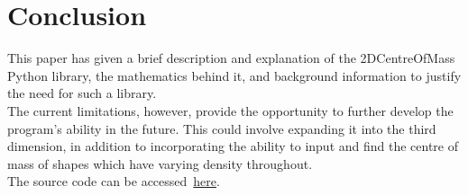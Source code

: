 \documentclass{article}
\begin{document}
\section{Conclusion}
This paper has given a brief description and explanation of the 2DCentreOfMass Python library, the mathematics behind it, and background information to justify the need for such a library.\\
The current limitations, however, provide the opportunity to further develop the program's ability in the future. This could involve expanding it into the third dimension, in addition to incorporating the ability to input and find the centre of mass of shapes which have varying density throughout.\\
The source code can be accessed~\href{https://github.com/TanishqK27/2DCentreOfMass/blob/master/src/CentreOfMass.py}{here}.


 
\end{document}
